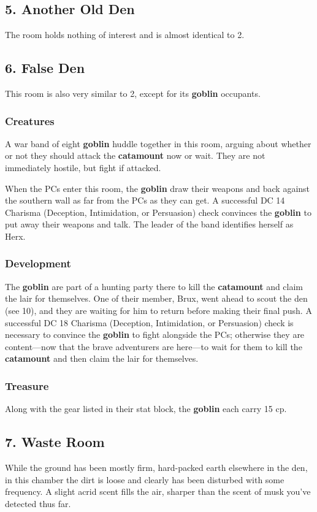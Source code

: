 \documentclass[10pt,a4paper,twoside,bg=print,twocolumn,openany,nodeprecatedcode]{dndbook}
\begin{document}
\subsection{5. Another Old Den}
The room holds nothing of interest and is almost identical to 2.

\subsection{6. False Den}
This room is also very similar to 2, except for its \textbf{goblin} occupants.

\subsubsection{Creatures}
A war band of eight \textbf{goblin} huddle together in this room, arguing about whether or not they should attack the \textbf{catamount} now or wait. They are not immediately hostile, but fight if attacked.

When the PCs enter this room, the \textbf{goblin} draw their weapons and back against the southern wall as far from the PCs as they can get. A successful DC 14 Charisma (Deception, Intimidation, or Persuasion) check convinces the \textbf{goblin} to put away their weapons and talk. The leader of the band identifies herself as Herx.

\subsubsection{Development}
The \textbf{goblin} are part of a hunting party there to kill the \textbf{catamount} and claim the lair for themselves. One of their member, Brux, went ahead to scout the den (see 10), and they are waiting for him to return before making their final push. A successful DC 18 Charisma (Deception, Intimidation, or Persuasion) check is necessary to convince the \textbf{goblin} to fight alongside the PCs; otherwise they are content—now that the brave adventurers are here—to wait for them to kill the \textbf{catamount} and then claim the lair for themselves.

\subsubsection{Treasure}
Along with the gear listed in their stat block, the \textbf{goblin} each carry 15 cp.

\subsection{7. Waste Room}
\begin{DndReadAloud}{}
While the ground has been mostly firm, hard-packed earth elsewhere in the den, in this chamber the dirt is loose and clearly has been disturbed with some frequency. A slight acrid scent fills the air, sharper than the scent of musk you've detected thus far.

\end{DndReadAloud}
\end{document}
